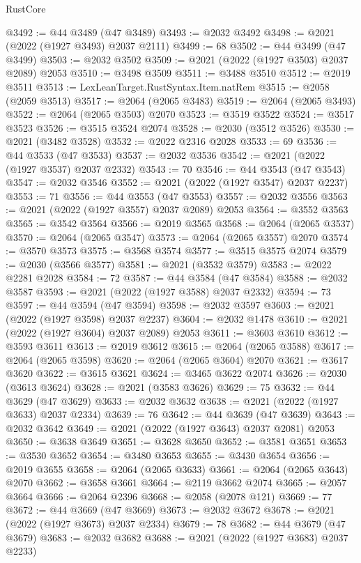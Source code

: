 \begin{lexlean}{RustCore}
\begin{coremodule}
@3492 := @44 @3489 (@47 @3489)
@3493 := @2032 @3492
@3498 := @2021 (@2022 (@1927 @3493) @2037 @2111)
@3499 := 68
@3502 := @44 @3499 (@47 @3499)
@3503 := @2032 @3502
@3509 := @2021 (@2022 (@1927 @3503) @2037 @2089) @2053
@3510 := @3498 @3509
@3511 := @3488 @3510
@3512 := @2019 @3511
@3513 := LexLeanTarget.RustSyntax.Item.natRem
@3515 := @2058 (@2059 @3513)
@3517 := @2064 (@2065 @3483)
@3519 := @2064 (@2065 @3493)
@3522 := @2064 (@2065 @3503) @2070
@3523 := @3519 @3522
@3524 := @3517 @3523
@3526 := @3515 @3524 @2074
@3528 := @2030 (@3512 @3526)
@3530 := @2021 (@3482 @3528)
@3532 := @2022 @2316 @2028
@3533 := 69
@3536 := @44 @3533 (@47 @3533)
@3537 := @2032 @3536
@3542 := @2021 (@2022 (@1927 @3537) @2037 @2332)
@3543 := 70
@3546 := @44 @3543 (@47 @3543)
@3547 := @2032 @3546
@3552 := @2021 (@2022 (@1927 @3547) @2037 @2237)
@3553 := 71
@3556 := @44 @3553 (@47 @3553)
@3557 := @2032 @3556
@3563 := @2021 (@2022 (@1927 @3557) @2037 @2089) @2053
@3564 := @3552 @3563
@3565 := @3542 @3564
@3566 := @2019 @3565
@3568 := @2064 (@2065 @3537)
@3570 := @2064 (@2065 @3547)
@3573 := @2064 (@2065 @3557) @2070
@3574 := @3570 @3573
@3575 := @3568 @3574
@3577 := @3515 @3575 @2074
@3579 := @2030 (@3566 @3577)
@3581 := @2021 (@3532 @3579)
@3583 := @2022 @2281 @2028
@3584 := 72
@3587 := @44 @3584 (@47 @3584)
@3588 := @2032 @3587
@3593 := @2021 (@2022 (@1927 @3588) @2037 @2332)
@3594 := 73
@3597 := @44 @3594 (@47 @3594)
@3598 := @2032 @3597
@3603 := @2021 (@2022 (@1927 @3598) @2037 @2237)
@3604 := @2032 @1478
@3610 := @2021 (@2022 (@1927 @3604) @2037 @2089) @2053
@3611 := @3603 @3610
@3612 := @3593 @3611
@3613 := @2019 @3612
@3615 := @2064 (@2065 @3588)
@3617 := @2064 (@2065 @3598)
@3620 := @2064 (@2065 @3604) @2070
@3621 := @3617 @3620
@3622 := @3615 @3621
@3624 := @3465 @3622 @2074
@3626 := @2030 (@3613 @3624)
@3628 := @2021 (@3583 @3626)
@3629 := 75
@3632 := @44 @3629 (@47 @3629)
@3633 := @2032 @3632
@3638 := @2021 (@2022 (@1927 @3633) @2037 @2334)
@3639 := 76
@3642 := @44 @3639 (@47 @3639)
@3643 := @2032 @3642
@3649 := @2021 (@2022 (@1927 @3643) @2037 @2081) @2053
@3650 := @3638 @3649
@3651 := @3628 @3650
@3652 := @3581 @3651
@3653 := @3530 @3652
@3654 := @3480 @3653
@3655 := @3430 @3654
@3656 := @2019 @3655
@3658 := @2064 (@2065 @3633)
@3661 := @2064 (@2065 @3643) @2070
@3662 := @3658 @3661
@3664 := @2119 @3662 @2074
@3665 := @2057 @3664
@3666 := @2064 @2396
@3668 := @2058 (@2078 @121)
@3669 := 77
@3672 := @44 @3669 (@47 @3669)
@3673 := @2032 @3672
@3678 := @2021 (@2022 (@1927 @3673) @2037 @2334)
@3679 := 78
@3682 := @44 @3679 (@47 @3679)
@3683 := @2032 @3682
@3688 := @2021 (@2022 (@1927 @3683) @2037 @2233)

\end{coremodule}
\end{lexlean}
